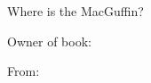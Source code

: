 \documentclass{article}
\begin{document}
\centering
\Huge
\mbox{}\\\mbox{}\\\mbox{}\\\mbox{}\\\mbox{}\\\mbox{}\\\mbox{}\\
Where is the MacGuffin?

\vspace{3cm}
\LARGE
Owner of book:\\
\vspace{2cm}
\begin{addmargin}[8em]{8em}
\hrulefill
\end{addmargin}

\newpage

\centering
\LARGE
From:

\justifying

\newpage %
\end{document}
